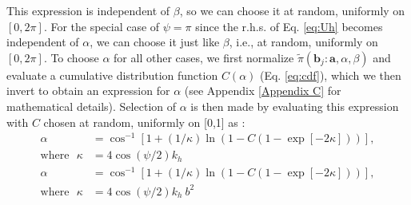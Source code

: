         This expression is independent of $\beta$, so we can choose it at random, uniformly on $[0, 2\pi]$. For the special case of $\psi = \pi$ since the r.h.s. of Eq. \eqref{eq:Uh} becomes independent of $\alpha$, we can choose it just like $\beta$, i.e., at random, uniformly on $[0, 2\pi]$. To choose $\alpha$ for all other cases, we first normalize $\tilde \pi({\mathbf b}_j: \mathbf{a}, \alpha, \beta) $ and evaluate a cumulative distribution function $C(\alpha)$ (Eq. \eqref{eq:cdf}), which we then invert to obtain an expression for $\alpha$ (see Appendix \ref{Appendix C} for mathematical details). Selection of $\alpha$ is then made by evaluating this expression with $C$ chosen at random, uniformly on [0,1] as :
        \ifkhExplicitP
            \begin{equation}
            \label{eq:alpha}
                \begin{aligned}
                    \alpha &= \cos^{-1} \left[1 +  (1/\kappa)\ln\left(1 - C (1-\exp[-2\kappa]) \right) \right],\\
                    \text{where}\:\:\: \kappa &= 4 \cos(\psi/2) k_h
                \end{aligned}
            \end{equation}
        \else
            \begin{equation}
            \label{eq:alpha}
                \begin{aligned}
                    \alpha &= \cos^{-1} \left[1 +  (1/\kappa)\ln\left(1 - C (1-\exp[-2\kappa]) \right) \right],\\
                    \text{where}\:\:\: \kappa &= 4 \cos(\psi/2) k_h~b^2
                \end{aligned}
            \end{equation}
        \fi

